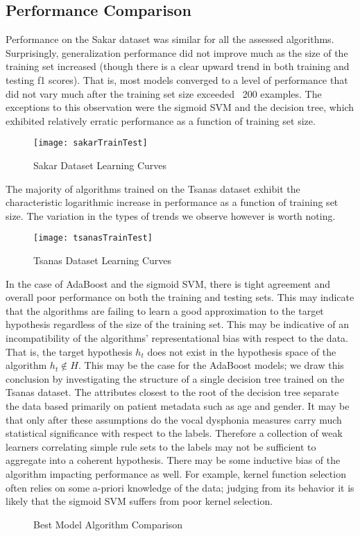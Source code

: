 \documentclass[12pt]{article}
\begin{document}
\subsection{Performance Comparison}
Performance on the Sakar dataset was similar for all the assessed algorithms. Surprisingly, generalization performance did not improve much as the size of the training set increased (though there is a clear upward trend in both training and testing f1 scores). That is, most models converged to a level of performance that did not vary much after the training set size exceeded ~200 examples. The exceptions to this observation were the sigmoid SVM and the decision tree, which exhibited relatively erratic performance as a function of training set size.
\begin{figure}
    \centering
    \texttt{[image: sakarTrainTest]}
    \caption{Sakar Dataset Learning Curves}
\end{figure}
The majority of algorithms trained on the Tsanas dataset exhibit the characteristic logarithmic increase in performance as a function of training set size. The variation in the types of trends we observe however is worth noting.
\begin{figure}
    \centering
    \texttt{[image: tsanasTrainTest]}
    \caption{Tsanas Dataset Learning Curves}
\end{figure}
In the case of AdaBoost and the sigmoid SVM, there is tight agreement and overall poor performance on both the training and testing sets. This may indicate that the algorithms are failing to learn a good approximation to the target hypothesis regardless of the size of the training set. This may be indicative of an incompatibility of the algorithms' representational bias with respect to the data. That is, the target hypothesis $h_t$ does not exist in the hypothesis space of the algorithm $h_t \notin H$. This may be the case for the AdaBoost models; we draw this conclusion by investigating the structure of a single decision tree trained on the Tsanas dataset. The attributes closest to the root of the decision tree separate the data based primarily on patient metadata such as age and gender. It may be that only after these assumptions do the vocal dysphonia measures carry much statistical significance with respect to the labels. Therefore a collection of weak learners correlating simple rule sets to the labels may not be sufficient to aggregate into a coherent hypothesis.  There may be some inductive bias of the algorithm impacting performance as well. For example, kernel function selection often relies on some a-priori knowledge of the data; judging from its behavior it is likely that the sigmoid SVM suffers from poor kernel selection.
\begin{figure}%
    \centering
    \qquad
    \caption{Best Model Algorithm Comparison}
    \label{fig:algorithm_perf}%
\end{figure}
\end{document}
